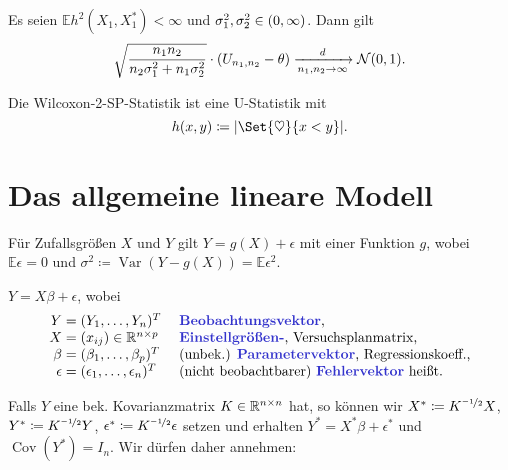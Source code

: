 \documentclass{cheat-sheet}
\newcommand{\E}{\mathbb{E}} %
\DeclareMathOperator{\var}{Var} %
\DeclareMathOperator{\cov}{Cov} %
\newcommand{\Normal}{\mathcal{N}} %
\begin{document}
\begin{lem}
  Es seien $\E h^2(X_1, X_1^*) < \infty$ und $\sigma_1^2, \sigma_2^2 \in \left( 0, \infty \right)$.
  Dann gilt
  \[
    \sqrt{\frac{n_1 n_2}{n_2 \sigma_1^2 + n_1 \sigma_2^2}} \cdot
    (U_{n_1, n_2} - \theta) \xra[n_1, n_2 \to \infty]{d} \Normal(0, 1).
  \]
\end{lem}

\begin{bsp}
  Die Wilcoxon-2-SP-Statistik ist eine U-Statistik mit
  \[ h(x, y) \coloneqq \abs{\Set{\heartsuit}{x < y}}. \]
\end{bsp}

\section{Das allgemeine lineare Modell}

\begin{modell}[allgemein]
  Für Zufallsgrößen $X$ und $Y$ gilt $Y = g(X) + \epsilon$ mit einer Funktion $g$, wobei $\E \epsilon = 0$ und $\sigma^2 \coloneqq \var (Y - g(X)) = \E \epsilon^2$.
\end{modell}

\begin{modell}
  $Y = X \beta + \epsilon$, wobei
  \[
    \arraycolsep=1.4pt
    \begin{array}{r c l l}
      Y &=& (Y_1, \ldots, Y_n)^T \quad & \text{\emph{Beobachtungsvektor},} \\
      X &=& (x_{ij}) \in \R^{n \times p} & \text{\emph{Einstellgrößen-}, Versuchsplanmatrix,} \\
      \beta &=& (\beta_1, \ldots, \beta_p)^T & \text{(unbek.) \emph{Parametervektor}, Regressionskoeff.,} \\
      \epsilon &=& (\epsilon_1, \ldots, \epsilon_n)^T & \text{(nicht beobachtbarer) \emph{Fehlervektor} heißt.}
    \end{array}
  \]
\end{modell}


\begin{bem}
  Falls $Y$ eine bek. Kovarianzmatrix $K \in \mathbb{R}^{n \times n}$ hat, so können wir $X^* \coloneqq K^{\nicefrac{-1}{2}} X$, $Y^* \coloneqq K^{\nicefrac{-1}{2}} Y$, $\epsilon^* \coloneqq K^{\nicefrac{-1}{2}} \epsilon$ setzen und erhalten $Y^* = X^* \beta + \epsilon^*$ und $\cov(Y^*) = I_n$.
  Wir dürfen daher annehmen:
\end{bem}
\end{document}
